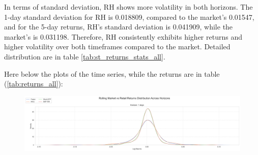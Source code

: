 In terms of standard deviation, RH shows more volatility in both horizons. 
The 1-day standard deviation for RH is 0.018809, compared to the market's 0.01547, and for the 5-day returns, RH's standard deviation is 0.041909, while the market's is 0.031198. 
Therefore, RH consistently exhibits higher returns and higher volatility over both timeframes compared to the market. Detailed distribution are in table \ref{tab:st_returns_stats_all}.

Here below the plots of the time series, while the returns are in table (\ref{tab:returns_all}):
\begin{figure}[h!]
    \centering
    \includegraphics[width=1\linewidth]
    {../images/distributions/st_all.png}
\end{figure}


